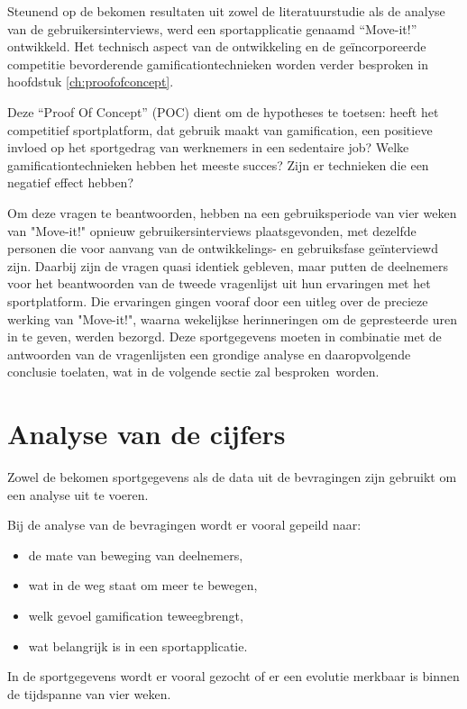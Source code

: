 Steunend op de bekomen resultaten uit zowel de literatuurstudie als de analyse van de gebruikersinterviews, werd een sportapplicatie genaamd ``Move-it!'' ontwikkeld. Het technisch aspect van de ontwikkeling en de geïncorporeerde competitie bevorderende gamificationtechnieken worden verder besproken in hoofdstuk \ref{ch:proofofconcept}.

Deze ``Proof Of Concept'' (POC) dient om de hypotheses te toetsen: heeft het competitief sportplatform, dat gebruik maakt van gamification, een positieve invloed op het sportgedrag van werknemers in een sedentaire job? Welke gamificationtechnieken hebben het meeste succes? Zijn er technieken die een negatief effect hebben?

Om deze vragen te beantwoorden, hebben na een gebruiksperiode van vier weken van "Move-it!" opnieuw gebruikersinterviews plaatsgevonden, met dezelfde personen die voor aanvang van de ontwikkelings- en gebruiksfase geïnterviewd zijn.
Daarbij zijn de vragen quasi identiek gebleven, maar putten de deelnemers voor het beantwoorden van de tweede vragenlijst uit hun ervaringen met het sportplatform. Die ervaringen gingen vooraf door een uitleg over de precieze werking van "Move-it!", waarna wekelijkse herinneringen om de gepresteerde uren in te geven, werden bezorgd. Deze sportgegevens moeten in combinatie met de antwoorden van de vragenlijsten een grondige analyse en daaropvolgende conclusie toelaten, wat in de volgende sectie zal besproken worden.

\section{Analyse van de cijfers}

Zowel de bekomen sportgegevens als de data uit de bevragingen zijn gebruikt om een analyse uit te voeren.

Bij de analyse van de bevragingen wordt er vooral gepeild naar:
\begin{itemize}
    \item de mate van beweging van deelnemers,
    \item wat in de weg staat om meer te bewegen,
    \item welk gevoel gamification teweegbrengt,
    \item wat belangrijk is in een sportapplicatie.
\end{itemize}

In de sportgegevens wordt er vooral gezocht of er een evolutie merkbaar is binnen de tijdspanne van vier weken.

